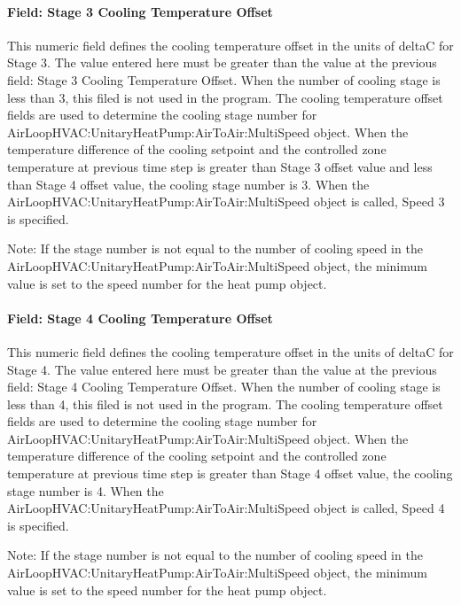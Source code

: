 \paragraph{Field: Stage 3 Cooling Temperature Offset}\label{field-stage-3-cooling-temperature-offset}

This numeric field defines the cooling temperature offset in the units of deltaC for Stage 3. The value entered here must be greater than the value at the previous field: Stage 3 Cooling Temperature Offset. When the number of cooling stage is less than 3, this filed is not used in the program. The cooling temperature offset fields are used to determine the cooling stage number for AirLoopHVAC:UnitaryHeatPump:AirToAir:MultiSpeed object. When the temperature difference of the cooling setpoint and the controlled zone temperature at previous time step is greater than Stage 3 offset value and less than Stage 4 offset value, the cooling stage number is 3. When the AirLoopHVAC:UnitaryHeatPump:AirToAir:MultiSpeed object is called, Speed 3 is specified.

Note: If the stage number is not equal to the number of cooling speed in the AirLoopHVAC:UnitaryHeatPump:AirToAir:MultiSpeed object, the minimum value is set to the speed number for the heat pump object.

\paragraph{Field: Stage 4 Cooling Temperature Offset}\label{field-stage-4-cooling-temperature-offset}

This numeric field defines the cooling temperature offset in the units of deltaC for Stage 4. The value entered here must be greater than the value at the previous field: Stage 4 Cooling Temperature Offset. When the number of cooling stage is less than 4, this filed is not used in the program. The cooling temperature offset fields are used to determine the cooling stage number for AirLoopHVAC:UnitaryHeatPump:AirToAir:MultiSpeed object. When the temperature difference of the cooling setpoint and the controlled zone temperature at previous time step is greater than Stage 4 offset value, the cooling stage number is 4. When the AirLoopHVAC:UnitaryHeatPump:AirToAir:MultiSpeed object is called, Speed 4 is specified.

Note: If the stage number is not equal to the number of cooling speed in the AirLoopHVAC:UnitaryHeatPump:AirToAir:MultiSpeed object, the minimum value is set to the speed number for the heat pump object.

